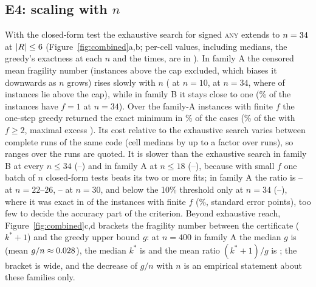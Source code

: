 \documentclass[10pt,a4paper]{article}
\theoremstyle{plain}
\theoremstyle{definition}
\theoremstyle{remark}
\newcommand{\tsc}[1]{\textnormal{\textsc{#1}}}  %
\begin{document}
\subsection{E4: scaling with \texorpdfstring{$n$}{n}}
With the closed-form test the exhaustive search for signed \tsc{any} extends to $n=34$ at $|R|\le6$ (Figure~\ref{fig:combined}a,b; per-cell values, including medians, the greedy's exactness at each $n$ and the times, are in ). In family A the censored mean fragility number (instances above the cap excluded, which biases it downwards as $n$ grows) rises slowly with $n$ (\EfourATenMean{} at $n=10$, \EfourAThirtyfourMean{} at $n=34$, where \EfourAThirtyfourNotFound{} of \EfourAThirtyfourInstances{} instances lie above the cap), while in family B it stays close to one (\EfourBThirtyfourFracOne\% of the instances have $f=1$ at $n=34$). Over the \EfourANAll{} family-A instances with finite $f$ the one-step greedy returned the exact minimum in \EfourAOnestepExactAll\% of the cases (\EfourAOnestepExactNT\% of the \EfourANT{} with $f\ge2$, maximal excess \EfourAOnestepMaxGap). Its cost relative to the exhaustive search varies between complete runs of the same code (cell medians by up to a factor \EfourRunFactor{} over \CostRuns{} runs), so ranges over the runs are quoted. It is slower than the exhaustive search in family B at every $n\le34$ (\EfourBCostLo--\EfourBCostHi) and in family A at $n\le18$ (\EfourACostSmallLo--\EfourACostSmallHi), because with small $f$ one batch of $n$ closed-form tests beats its two or more fits; in family A the ratio is \EfourACostMidLo--\EfourACostMidHi{} at $n=22$--$26$, \EfourAThirtyCostLo--\EfourAThirtyCostHi{} at $n=30$, and below the 10\% threshold only at $n=34$ (\EfourAThirtyfourCostLo--\EfourAThirtyfourCostHi), where it was exact in \EfourAThirtyfourHits{} of the \EfourAThirtyfourFinite{} instances with finite $f$ (\EfourAThirtyfourOnestepExact\%, standard error \EfourAThirtyfourOnestepSE{} points), too few to decide the accuracy part of the criterion. Beyond exhaustive reach, Figure~\ref{fig:combined}c,d brackets the fragility number between the certificate ($k^\ast+1$) and the greedy upper bound $g$: at $n=400$ in family A the median $g$ is \EfourAFourhundredMedian{} (mean $g/n\approx0.028$), the median $k^\ast$ is \EfourAFourhundredKstar{} and the mean ratio $(k^\ast+1)/g$ is \EfourAFourhundredBracket; the bracket is wide, and the decrease of $g/n$ with $n$ is an empirical statement about these families only.
\end{document}
